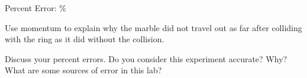 \documentclass[10pt]{exam}
\begin{document}
\begin{questions}
\begin{flushright}
  Percent Error: \fillin[][5em] \%
\end{flushright}

\question
Use momentum to explain why the marble did not travel out as far after colliding with the ring as it did without the collision.
\vs

\question
Discuss your percent errors. Do you consider this experiment accurate? Why? What are some sources of error in this lab?
\vs


\end{questions}
\end{document}
